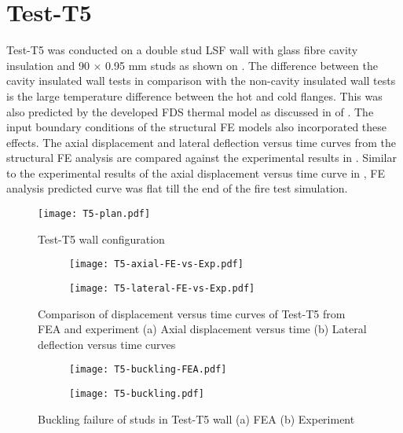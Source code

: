 \section*{Test-T5}

Test-T5 was conducted on a double stud LSF wall with glass fibre cavity insulation and 90 $\times$ 0.95 mm studs as shown on . The difference between the cavity insulated wall tests in comparison with the non-cavity insulated wall tests is the large temperature difference between the hot and cold flanges. This was also predicted by the developed FDS thermal model as discussed in  of . The input boundary conditions of the structural FE models also incorporated these effects. The axial displacement and lateral deflection versus time curves from the structural FE analysis are compared against the experimental results in . Similar to the experimental results of the axial displacement versus time curve in , FE analysis predicted curve was flat till the end of the fire test simulation. 
\begin{figure}[!htbp]
	\centering
			\texttt{[image: T5-plan.pdf]}\\
		\caption{Test-T5 wall configuration}
		\label{fig:T5-plan-FEA}
\end{figure}
\begin{figure}[!htbp]
	\centering
	\begin{subfigure}[b]{0.7\textwidth}
		\centering
		\texttt{[image: T5-axial-FE-vs-Exp.pdf]}
		\caption{}
		\label{subfig:T5-axial-FE-vs-Exp}
	\end{subfigure}
	\begin{subfigure}[b]{0.7\textwidth}
		\centering
		\texttt{[image: T5-lateral-FE-vs-Exp.pdf]}
		\caption{}
		\label{subfig:T5-lateral-FE-vs-Exp}
	\end{subfigure}
	   \caption{Comparison of displacement versus time curves of Test-T5 from FEA and experiment (a) Axial displacement versus time (b) Lateral deflection versus time curves}
	   \label{fig:T5-structural-FE-vs-Exp}
\end{figure} 
\begin{figure}[!htbp]
	\centering
	\begin{subfigure}[b]{0.85\textwidth}
		\centering
		\texttt{[image: T5-buckling-FEA.pdf]}
		\caption{}
		\label{subfig:T5-buckling-FEA}
	\end{subfigure}
	\begin{subfigure}[b]{0.55\textwidth}
		\centering
		\texttt{[image: T5-buckling.pdf]}
		\caption{}
		\label{subfig:T5-buckling-FEA-Exp}
	\end{subfigure}
	   \caption{Buckling failure of studs in Test-T5 wall (a) FEA (b) Experiment}
	   \label{fig:T5-buckling-FE-vs-Exp}
\end{figure} 

